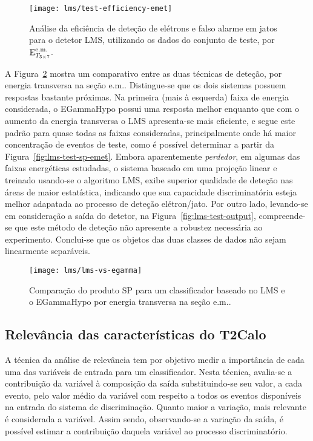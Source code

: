 \begin{figure}
\begin{center}
\texttt{[image: lms/test-efficiency-emet]}
\end{center}
\caption{Análise da eficiência de deteção de elétrons e falso alarme em jatos
para o detetor LMS, utilizando os dados do conjunto de teste, por $\text{E}^{\text{e.m.}}_{T_{3\times7}}$.}
\label{fig:lms-test-efficiency-emet}
\end{figure}

A Figura~\ref{fig:lms-vs-egamma} mostra um comparativo entre as duas técnicas
de deteção, por energia transversa na seção e.m.. Distingue-se que os dois
sistemas possuem respostas bastante próximas. Na primeira (mais à esquerda)
faixa de energia considerada, o EGammaHypo possui uma resposta melhor enquanto
que com o aumento da energia transversa o LMS apresenta-se mais eficiente, e
segue este padrão para quase todas as faixas consideradas, principalmente onde
há maior concentração de eventos de teste, como é possível determinar a partir
da Figura~\ref{fig:lms-test-sp-emet}. Embora aparentemente \textit{perdedor},
em algumas das faixas energéticas estudadas, o sistema baseado em uma projeção
linear e treinado usando-se o algoritmo LMS, exibe superior qualidade de
deteção nas áreas de maior estatística, indicando que sua capacidade
discriminatória esteja melhor adapatada ao processo de deteção
elétron/jato. Por outro lado, levando-se em consideração a saída do detetor,
na Figura~\ref{fig:lms-test-output}, compreende-se que este método de deteção
não apresente a robustez necessária ao experimento. Conclui-se que os objetos
das duas classes de dados não sejam linearmente separáveis.

\begin{figure}
\begin{center}
\texttt{[image: lms/lms-vs-egamma]}
\end{center}
\caption{Comparação do produto SP para um classificador baseado no LMS e o
EGammaHypo por energia transversa na seção e.m..}
\label{fig:lms-vs-egamma}
\end{figure}

\subsection{Relevância das características do T2Calo}

A técnica da análise de relevância \cite{relevance} tem por objetivo medir a
importância de cada uma das variáveis de entrada para um classificador. Nesta
técnica, avalia-se a contribuição da variável à composição da saída
substituindo-se seu valor, a cada evento, pelo valor médio da variável com
respeito a todos os eventos disponíveis na entrada do sistema de
discriminação. Quanto maior a variação, mais relevante é considerada a
variável. Assim sendo, observando-se a variação da saída, é possível estimar a
contribuição daquela variável ao processo discriminatório. 

